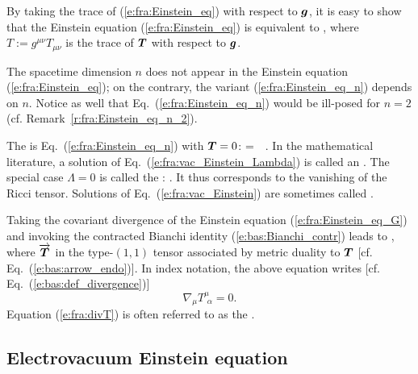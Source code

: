 By taking the trace of (\ref{e:fra:Einstein_eq}) with respect to $\bm{g}$, it is
easy to show that the Einstein equation (\ref{e:fra:Einstein_eq}) is
equivalent to
\be \label{e:fra:Einstein_eq_n}
    ,
\ee
where $T := g^{\mu\nu} T_{\mu\nu}$ is the trace of $\bm{T}$ with respect to
$\bm{g}$.

\begin{remark}
The spacetime dimension $n$ does not appear in the Einstein equation
(\ref{e:fra:Einstein_eq}); on the contrary, the variant
(\ref{e:fra:Einstein_eq_n}) depends on $n$. Notice as well that
Eq.~(\ref{e:fra:Einstein_eq_n}) would be ill-posed for $n=2$
(cf. Remark~\ref{r:fra:Einstein_eq_n_2}).
\end{remark}

The  is
Eq.~(\ref{e:fra:Einstein_eq_n}) with $\bm{T}=0$:
\be \label{e:fra:vac_Einstein_Lambda}
      = \,\Lambda\,   .
\ee
In the mathematical literature, a solution of Eq.~(\ref{e:fra:vac_Einstein_Lambda})
is called an .
The special case $\Lambda=0$ is called the
:
 \be \label{e:fra:vac_Einstein}
    .
\ee
It thus corresponds to the vanishing of the Ricci tensor. Solutions of
Eq.~(\ref{e:fra:vac_Einstein}) are sometimes called
.

Taking the covariant divergence of the Einstein equation (\ref{e:fra:Einstein_eq_G})
and invoking the contracted Bianchi identity (\ref{e:bas:Bianchi_contr}) leads
to
\be \label{e:fra:divT}
    ,
\ee
where $\overrightarrow{\bm{T}}$ in the type-$(1,1)$ tensor associated by metric duality
to $\bm{T}$ [cf. Eq.~(\ref{e:bas:arrow_endo})]. In index notation, the above
equation writes [cf. Eq.~(\ref{e:bas:def_divergence})]
\[
    \nabla_\mu T^\mu_{\ \, \alpha} = 0 .
\]
Equation (\ref{e:fra:divT}) is often referred to as the .

\subsection{Electrovacuum Einstein equation} \label{e:fra:electrovacuum}

